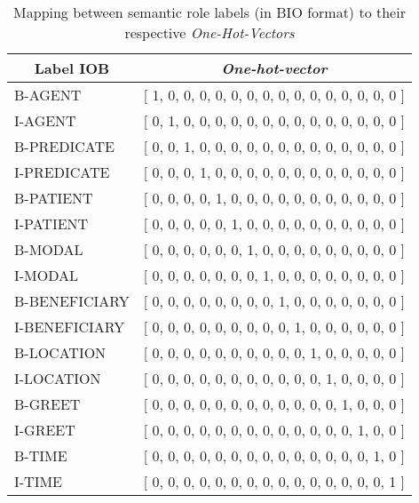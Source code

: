 \begin{table}
	\centering
	\caption{Mapping between semantic role labels (in BIO format) to their respective \textit{One-Hot-Vectors}}
	\label{table:onehotlabel}
	\begin{tabular}{|l|l|}
		\hline
		\multicolumn{1}{|c|}{Label IOB} & \multicolumn{1}{c|}{\textit{One-hot-vector}} \\ \hline
		B-AGENT 				& {[} 1, 0, 0, 0, 0, 0, 0, 0, 0, 0, 0, 0, 0, 0, 0, 0 {]} \\ \hline
		I-AGENT					& {[} 0, 1, 0, 0, 0, 0, 0, 0, 0, 0, 0, 0, 0, 0, 0, 0 {]} \\ \hline
		B-PREDICATE 		& {[} 0, 0, 1, 0, 0, 0, 0, 0, 0, 0, 0, 0, 0, 0, 0, 0 {]} \\ \hline
		I-PREDICATE 		& {[} 0, 0, 0, 1, 0, 0, 0, 0, 0, 0, 0, 0, 0, 0, 0, 0 {]} \\ \hline
		B-PATIENT 			& {[} 0, 0, 0, 0, 1, 0, 0, 0, 0, 0, 0, 0, 0, 0, 0, 0 {]} \\ \hline
		I-PATIENT			 & {[} 0, 0, 0, 0, 0, 1, 0, 0, 0, 0, 0, 0, 0, 0, 0, 0 {]} \\ \hline
		B-MODAL 			& {[} 0, 0, 0, 0, 0, 0, 1, 0, 0, 0, 0, 0, 0, 0, 0, 0 {]} \\ \hline
		I-MODAL 			& {[} 0, 0, 0, 0, 0, 0, 0, 1, 0, 0, 0, 0, 0, 0, 0, 0 {]} \\ \hline
		B-BENEFICIARY 	& {[} 0, 0, 0, 0, 0, 0, 0, 0, 1, 0, 0, 0, 0, 0, 0, 0 {]} \\ \hline
		I-BENEFICIARY 	& {[} 0, 0, 0, 0, 0, 0, 0, 0, 0, 1, 0, 0, 0, 0, 0, 0 {]} \\ \hline
		B-LOCATION 		& {[} 0, 0, 0, 0, 0, 0, 0, 0, 0, 0, 1, 0, 0, 0, 0, 0 {]} \\ \hline
		I-LOCATION		 & {[} 0, 0, 0, 0, 0, 0, 0, 0, 0, 0, 0, 1, 0, 0, 0, 0 {]} \\ \hline
		B-GREET 			& {[} 0, 0, 0, 0, 0, 0, 0, 0, 0, 0, 0, 0, 1, 0, 0, 0 {]} \\ \hline
		I-GREET 			& {[} 0, 0, 0, 0, 0, 0, 0, 0, 0, 0, 0, 0, 0, 1, 0, 0 {]} \\ \hline
		B-TIME 				& {[} 0, 0, 0, 0, 0, 0, 0, 0, 0, 0, 0, 0, 0, 0, 1, 0 {]} \\ \hline
		I-TIME 				& {[} 0, 0, 0, 0, 0, 0, 0, 0, 0, 0, 0, 0, 0, 0, 0, 1 {]} \\ \hline
	\end{tabular}
\end{table}